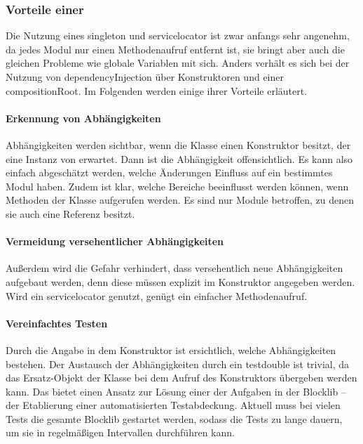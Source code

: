 \subsubsection{Vorteile einer }

Die Nutzung eines \gls{singleton} und \gls{servicelocator} ist zwar anfangs sehr angenehm, da jedes Modul nur einen Methodenaufruf entfernt ist, sie bringt aber auch die gleichen Probleme wie globale Variablen mit sich. Anders verhält es sich bei der Nutzung von \gls{dependencyInjection} über Konstruktoren und einer \gls{compositionRoot}. Im Folgenden werden einige ihrer Vorteile erläutert.

\paragraph{Erkennung von Abhängigkeiten}Abhängigkeiten werden sichtbar, wenn die Klasse einen Konstruktor besitzt, der eine Instanz von \classWorldInteraction{} erwartet. Dann ist die Abhängigkeit offensichtlich. Es kann also einfach abgeschätzt werden, welche Änderungen Einfluss auf ein bestimmtes Modul haben. Zudem ist klar, welche Bereiche beeinflusst werden können, wenn Methoden der Klasse aufgerufen werden. Es sind nur Module betroffen, zu denen sie auch eine Referenz besitzt.

\paragraph{Vermeidung versehentlicher Abhängigkeiten} Außerdem wird die Gefahr verhindert, dass versehentlich neue Abhängigkeiten aufgebaut werden, denn diese müssen explizit im Konstruktor angegeben werden. Wird ein \gls{servicelocator} genutzt, genügt ein einfacher Methodenaufruf.

\paragraph{Vereinfachtes Testen} Durch die Angabe in dem Konstruktor ist ersichtlich, welche Abhängigkeiten bestehen. Der Austausch der Abhängigkeiten durch ein \gls{testdouble} ist trivial, da das Ersatz-Objekt der Klasse bei dem Aufruf des Konstruktors übergeben werden kann. Das bietet einen Ansatz zur Lösung einer der Aufgaben in der Blocklib -- der Etablierung einer automatisierten Testabdeckung. Aktuell muss bei vielen Tests die gesamte Blocklib gestartet werden, sodass die Tests zu lange dauern, um sie in regelmäßigen Intervallen durchführen kann.

